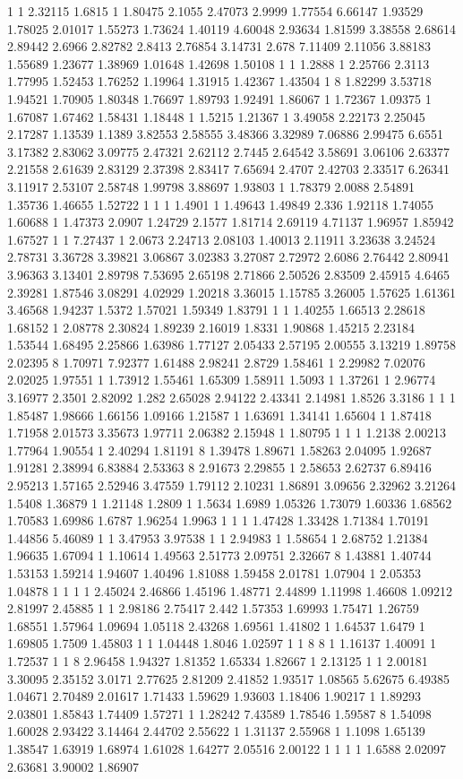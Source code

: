1 1 2.32115 1.6815 1 1.80475 2.1055 2.47073 2.9999 1.77554 6.66147 1.93529 1.78025 2.01017 1.55273 1.73624 1.40119 4.60048 2.93634 1.81599 3.38558 2.68614 2.89442 2.6966 2.82782 2.8413 2.76854 3.14731 2.678 7.11409 2.11056 3.88183 1.55689 1.23677 1.38969 1.01648 1.42698 1.50108 1 1 1.2888 1 2.25766 2.3113 1.77995 1.52453 1.76252 1.19964 1.31915 1.42367 1.43504 1 8 1.82299 3.53718 1.94521 1.70905 1.80348 1.76697 1.89793 1.92491 1.86067 1 1.72367 1.09375 1 1.67087 1.67462 1.58431 1.18448 1 1.5215 1.21367 1 3.49058 2.22173 2.25045 2.17287 1.13539 1.1389 3.82553 2.58555 3.48366 3.32989 7.06886 2.99475 6.6551 3.17382 2.83062 3.09775 2.47321 2.62112 2.7445 2.64542 3.58691 3.06106 2.63377 2.21558 2.61639 2.83129 2.37398 2.83417 7.65694 2.4707 2.42703 2.33517 6.26341 3.11917 2.53107 2.58748 1.99798 3.88697 1.93803 1 1.78379 2.0088 2.54891 1.35736 1.46655 1.52722 1 1 1 1.4901 1 1.49643 1.49849 2.336 1.92118 1.74055 1.60688 1 1.47373 2.0907 1.24729 2.1577 1.81714 2.69119 4.71137 1.96957 1.85942 1.67527 1 1 7.27437 1 2.0673 2.24713 2.08103 1.40013 2.11911 3.23638 3.24524 2.78731 3.36728 3.39821 3.06867 3.02383 3.27087 2.72972 2.6086 2.76442 2.80941 3.96363 3.13401 2.89798 7.53695 2.65198 2.71866 2.50526 2.83509 2.45915 4.6465 2.39281 1.87546 3.08291 4.02929 1.20218 3.36015 1.15785 3.26005 1.57625 1.61361 3.46568 1.94237 1.5372 1.57021 1.59349 1.83791 1 1 1.40255 1.66513 2.28618 1.68152 1 2.08778 2.30824 1.89239 2.16019 1.8331 1.90868 1.45215 2.23184 1.53544 1.68495 2.25866 1.63986 1.77127 2.05433 2.57195 2.00555 3.13219 1.89758 2.02395 8 1.70971 7.92377 1.61488 2.98241 2.8729 1.58461 1 2.29982 7.02076 2.02025 1.97551 1 1.73912 1.55461 1.65309 1.58911 1.5093 1 1.37261 1 2.96774 3.16977 2.3501 2.82092 1.282 2.65028 2.94122 2.43341 2.14981 1.8526 3.3186 1 1 1 1.85487 1.98666 1.66156 1.09166 1.21587 1 1.63691 1.34141 1.65604 1 1.87418 1.71958 2.01573 3.35673 1.97711 2.06382 2.15948 1 1.80795 1 1 1 1.2138 2.00213 1.77964 1.90554 1 2.40294 1.81191 8 1.39478 1.89671 1.58263 2.04095 1.92687 1.91281 2.38994 6.83884 2.53363 8 2.91673 2.29855 1 2.58653 2.62737 6.89416 2.95213 1.57165 2.52946 3.47559 1.79112 2.10231 1.86891 3.09656 2.32962 3.21264 1.5408 1.36879 1 1.21148 1.2809 1 1.5634 1.6989 1.05326 1.73079 1.60336 1.68562 1.70583 1.69986 1.6787 1.96254 1.9963 1 1 1 1.47428 1.33428 1.71384 1.70191 1.44856 5.46089 1 1 3.47953 3.97538 1 1 2.94983 1 1.58654 1 2.68752 1.21384 1.96635 1.67094 1 1.10614 1.49563 2.51773 2.09751 2.32667 8 1.43881 1.40744 1.53153 1.59214 1.94607 1.40496 1.81088 1.59458 2.01781 1.07904 1 2.05353 1.04878 1 1 1 1 2.45024 2.46866 1.45196 1.48771 2.44899 1.11998 1.46608 1.09212 2.81997 2.45885 1 1 2.98186 2.75417 2.442 1.57353 1.69993 1.75471 1.26759 1.68551 1.57964 1.09694 1.05118 2.43268 1.69561 1.41802 1 1.64537 1.6479 1 1.69805 1.7509 1.45803 1 1 1.04448 1.8046 1.02597 1 1 8 8 1 1.16137 1.40091 1 1.72537 1 1 8 2.96458 1.94327 1.81352 1.65334 1.82667 1 2.13125 1 1 2.00181 3.30095 2.35152 3.0171 2.77625 2.81209 2.41852 1.93517 1.08565 5.62675 6.49385 1.04671 2.70489 2.01617 1.71433 1.59629 1.93603 1.18406 1.90217 1 1.89293 2.03801 1.85843 1.74409 1.57271 1 1.28242 7.43589 1.78546 1.59587 8 1.54098 1.60028 2.93422 3.14464 2.44702 2.55622 1 1.31137 2.55968 1 1.1098 1.65139 1.38547 1.63919 1.68974 1.61028 1.64277 2.05516 2.00122 1 1 1 1 1.6588 2.02097 2.63681 3.90002 1.86907 